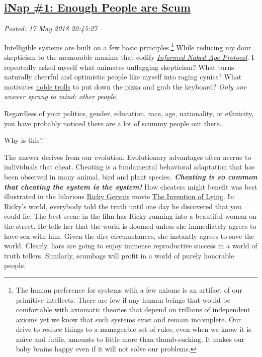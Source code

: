 %

\subsection*{\href{http://analyzethedatanotthedrivel.org/2018/05/17/inap-1-enough-people-are-scum/}{iNap \#1: Enough People are Scum}}


\noindent\emph{Posted: 17 May 2018 20:45:27}
\vspace{6pt}

Intelligible systems are built on a few basic
principles.\footnote{The human preference for systems with a few axioms is an artifact of
  our primitive intellects. There are few if any human beings that would
  be comfortable with axiomatic theories that depend on trillions of
  independent axioms yet we know that such systems exist and remain
  incomplete. Our drive to reduce things to a manageable set of rules,
  even when we know it is naïve and futile, amounts to little more than
  thumb-sucking. It makes our baby brains happy even if it will not
  solve our problems.
} While reducing
my dour skepticism to the memorable maxims that codify
\href{https://analyzethedatanotthedrivel.org/2018/05/08/informed-naked-ape-protocol/}{\emph{Informed
Naked Ape Protocol}}. I repeatedly asked myself what animates unflagging
skepticism? What turns naturally cheerful and optimistic people like
myself into raging cynics? What motivates
\href{https://www.lifewire.com/types-of-internet-trolls-3485894}{noble
trolls} to put down the pizza and grab the keyboard? \emph{Only one
answer sprang to mind: other people.}

Regardless of your politics, gender, education, race, age, nationality,
or ethnicity, you have probably noticed there are a lot of scummy people
out there.

Why is this?

The answer derives from our evolution. Evolutionary advantages often
accrue to individuals that cheat. Cheating is a fundamental behavioral
adaptation that has been observed in many animal, bird and plant
species\emph{. \textbf{Cheating is so common that cheating the system is
the system!}} How cheaters might benefit was best illustrated in the
hilarious
\href{https://www.imdb.com/name/nm0315041/?ref_=tt_ov_dr}{Ricky Gervais}
movie \href{https://www.imdb.com/title/tt1058017/}{The Invention of
Lying}. In Ricky's world, everybody told the truth until one day he
discovered that you could lie. The best scene in the film has Ricky
running into a beautiful woman on the street. He tells her that the
world is doomed unless she immediately agrees to have sex with him.
Given the dire circumstances, she instantly agrees to save the world.
Clearly, liars are going to enjoy immense reproductive success in a
world of truth tellers. Similarly, scumbags will profit in a world of
purely honorable people.

